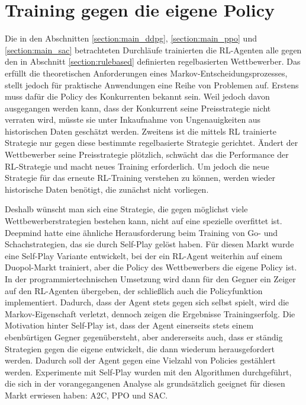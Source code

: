 \section{Training gegen die eigene Policy}
Die in den Abschnitten \ref{section:main_ddpg}, \ref{section:main_ppo} und \ref{section:main_sac} betrachteten Durchläufe trainierten die RL-Agenten alle gegen den in Abschnitt \ref{section:rulebased} definierten regelbasierten Wettbewerber.
Das erfüllt die theoretischen Anforderungen eines Markov-Entscheidungsprozesses, stellt jedoch für praktische Anwendungen eine Reihe von Problemen auf.
Erstens muss dafür die Policy des Konkurrenten bekannt sein.
Weil jedoch davon ausgegangen werden kann, dass der Konkurrent seine Preisstrategie nicht verraten wird, müsste sie unter Inkaufnahme von Ungenauigkeiten aus historischen Daten geschätzt werden.
Zweitens ist die mittels RL trainierte Strategie nur gegen diese bestimmte regelbasierte Strategie gerichtet.
Ändert der Wettbewerber seine Preisstrategie plötzlich, schwächt das die Performance der RL-Strategie und macht neues Training erforderlich.
Um jedoch die neue Strategie für das erneute RL-Training verstehen zu können, werden wieder historische Daten benötigt, die zunächst nicht vorliegen.

Deshalb wünscht man sich eine Strategie, die gegen möglichst viele Wettbewerberstrategien bestehen kann, nicht auf eine spezielle overfittet ist.
Deepmind hatte eine ähnliche Herausforderung beim Training von Go- und Schachstrategien, das sie durch Self-Play gelöst haben. \cite{Silver2017, https://doi.org/10.48550/arxiv.1712.01815}
Für diesen Markt wurde eine Self-Play Variante entwickelt, bei der ein RL-Agent weiterhin auf einem Duopol-Markt trainiert, aber die Policy des Wettbewerbers die eigene Policy ist.
In der programmiertechnischen Umsetzung wird dann für den Gegner ein Zeiger auf den RL-Agenten übergeben, der schließlich auch die Policyfunktion implementiert.
Dadurch, dass der Agent stets gegen sich selbst spielt, wird die Markov-Eigenschaft verletzt, dennoch zeigen die Ergebnisse Trainingserfolg.
Die Motivation hinter Self-Play ist, dass der Agent einerseits stets einem ebenbürtigen Gegner gegenübersteht, aber andererseits auch, dass er ständig Strategien gegen die eigene entwickelt, die dann wiederum herausgefordert werden.
Dadurch soll der Agent gegen eine Vielzahl von Policies gestählert werden.
Experimente mit Self-Play wurden mit den Algorithmen durchgeführt, die sich in der vorangegangenen Analyse als grundsätzlich geeignet für diesen Markt erwiesen haben: A2C, PPO und SAC.

